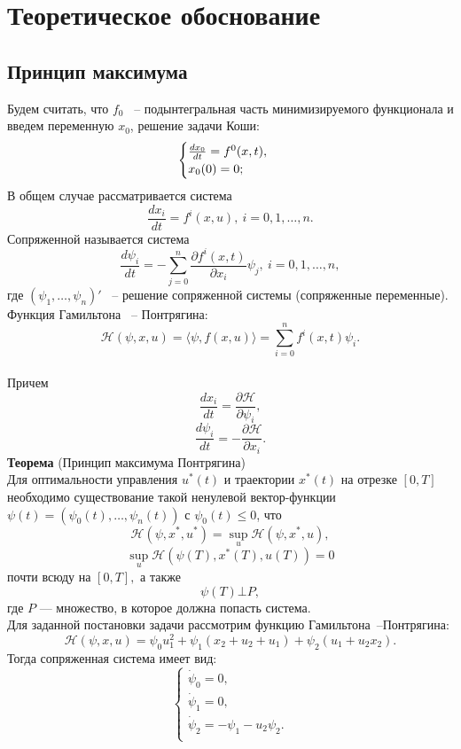 \documentclass[12pt, fleqn]{article}
\begin{document}
\newpage
\section{Теоретическое обоснование}
\subsection{Принцип максимума}
Будем считать, что $f_0$ ~-- подынтегральная часть минимизируемого функционала и введем переменную $x_0$, решение задачи Коши:
$$
\begin{cases}
\frac{dx_0}{dt} = f^0(x, t), \\
x_0(0) = 0;\\
\end{cases}\\
$$
В общем случае рассматривается система
$$
\frac{dx_i}{dt} = f^i(x, u),  \ i = 0, 1, \ldots, n.
$$
Сопряженной называется система
$$
\frac{d\psi_i}{dt} = -\sum_{j = 0}^{n} {\frac{\partial{f^i(x, t)}}{\partial{x_i}}}\psi_j, \ i = 0, 1, \ldots, n,
$$
где $(\psi_1, \ldots, \psi_n)'$ ~-- решение сопряженной системы (сопряженные переменные).\\
Функция Гамильтона ~-- Понтрягина:
$$
\mathcal{H}(\psi, x, u) = \langle \psi, f(x, u) \rangle = \sum_{i = 0}^{n} {f^i(x, t)}\psi_i. $$\\
Причем
$$
\frac{dx_i}{dt} = \frac{\partial{\mathcal{H}}}{\partial{\psi_i}},
$$
$$
\frac{d\psi_i}{dt} = -\frac{\partial{\mathcal{H}}}{\partial {x_i}}.
$$
\textbf{Теорема} (Принцип максимума Понтрягина) \\
Для оптимальности управления $u^*(t)$ и траектории $x^*(t)$ на отрезке $[0, T]$ необходимо существование такой ненулевой вектор-функции\\
$\psi(t) = (\psi_0(t), \ldots, \psi_n(t))$ с $\psi_0(t) \leqslant 0$, что
$$
\mathcal{H}(\psi, x^*, u^*) = \sup\limits_{u} \mathcal{H}(\psi, x^*, u), 
$$
$$
\sup\limits_{u} \mathcal{H}(\psi(T), x^*(T), u(T)) = 0$$ почти всюду на $[0, T], $
а также
$$
\psi(T) \bot P,
$$
где $P$ — множество, в которое должна попасть система.\\
Для заданной постановки задачи рассмотрим функцию Гамильтона~--Понтрягина:
$$
\mathcal{H}(\psi, x, u) = \psi_0 u_{1}^2 + \psi_1(x_2 + u_2 + u_1) + \psi_2(u_1 + u_2x_2).
$$
Тогда сопряженная система имеет вид:
\begin{equation}
\begin{cases}
\dot{\psi}_0 = 0,\\
\dot{\psi}_1 = 0, \\
\dot{\psi}_2 = -\psi_1 - u_2\psi_2.\\
\end{cases}
\label{3}
\end{equation}
\end{document}
